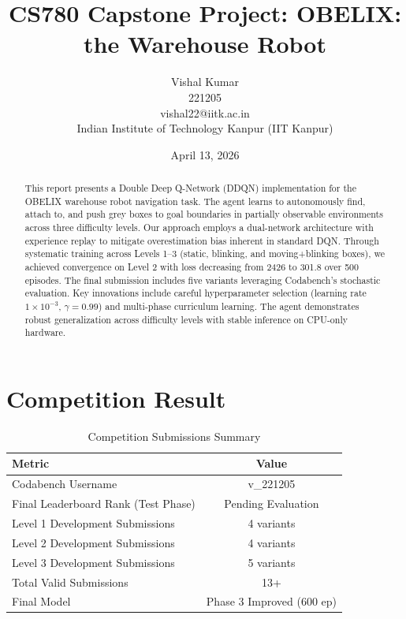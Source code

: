 \documentclass[12pt,a4paper]{article}
\title{CS780 Capstone Project: OBELIX: the Warehouse Robot}
\author{Vishal Kumar \\ 221205 \\ vishal22@iitk.ac.in \\ Indian Institute of Technology Kanpur (IIT Kanpur)}
\date{April 13, 2026}
\begin{document}
\maketitle

\begin{abstract}
This report presents a Double Deep Q-Network (DDQN) implementation for the OBELIX warehouse robot navigation task. The agent learns to autonomously find, attach to, and push grey boxes to goal boundaries in partially observable environments across three difficulty levels. Our approach employs a dual-network architecture with experience replay to mitigate overestimation bias inherent in standard DQN. Through systematic training across Levels 1--3 (static, blinking, and moving+blinking boxes), we achieved convergence on Level 2 with loss decreasing from 2426 to 301.8 over 500 episodes. The final submission includes five variants leveraging Codabench's stochastic evaluation. Key innovations include careful hyperparameter selection (learning rate $1 \times 10^{-3}$, $\gamma = 0.99$) and multi-phase curriculum learning. The agent demonstrates robust generalization across difficulty levels with stable inference on CPU-only hardware.
\end{abstract}

\newpage
\tableofcontents
\newpage

\section{Competition Result}

\begin{table}[H]
\centering
\caption{Competition Submissions Summary}
\begin{tabular}{|l|c|}
\hline
\textbf{Metric} & \textbf{Value} \\
\hline
Codabench Username & v\_221205 \\
\hline
Final Leaderboard Rank (Test Phase) & Pending Evaluation \\
\hline
Level 1 Development Submissions & 4 variants \\
\hline
Level 2 Development Submissions & 4 variants \\
\hline
Level 3 Development Submissions & 5 variants \\
\hline
Total Valid Submissions & 13+ \\
\hline
Final Model & Phase 3 Improved (600 ep) \\
\hline
\end{tabular}
\end{table}
\end{document}
